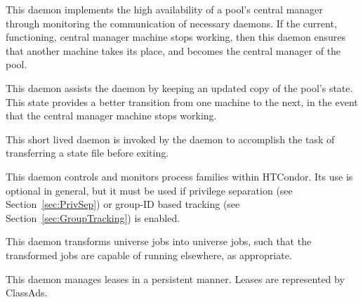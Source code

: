 \begin{description}
\item[\Condor{had}] This daemon
implements the high availability of a pool's central manager
through monitoring the communication of necessary daemons.
If the current, functioning, central manager machine
stops working, then this daemon ensures that another 
machine takes its place, and becomes the central manager of
the pool.

\item[\Condor{replication}] This daemon
assists the  daemon by keeping an updated copy of the
pool's state. This state provides a better transition
from one machine to the next, in the event 
that the central manager machine stops working.

\item[\Condor{transferer}] This short lived daemon is invoked by
the  daemon to accomplish the task of transferring
a state file before exiting.

\item[\Condor{procd}] This daemon
controls and monitors process families within HTCondor. Its use
is optional in general, but it must be used if privilege separation
(see Section~\ref{sec:PrivSep}) or group-ID based tracking (see
Section~\ref{sec:GroupTracking}) is enabled.

\item[\Condor{job\_router}] This daemon 
transforms  universe jobs into 
universe jobs, such that the transformed jobs are capable
of running elsewhere, as appropriate.

\item[\Condor{lease\_manager}] This daemon 
manages leases in a persistent manner.
Leases are represented by ClassAds.


\end{description}
